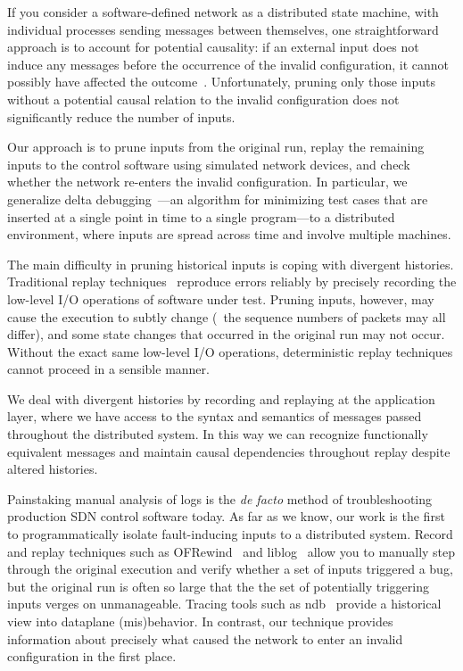 If you consider a software-defined network as a distributed state machine,
with individual processes sending messages between themselves, one straightforward approach is
to account for potential causality: if an external input does not induce any messages before
the occurrence of the invalid configuration, it
cannot possibly have affected the outcome~\cite{Lamport:1978:TCO:359545.359563}.
Unfortunately, pruning only those inputs without a potential causal relation to
the invalid configuration does not
significantly reduce the number of inputs.

Our approach is to prune inputs from the original run, replay the remaining
inputs to the control software using simulated network devices, and
check whether the network re-enters the invalid configuration.
In particular, we generalize delta
debugging~\cite{Zeller:2002:SIF:506201.506206}---an algorithm for
minimizing test cases that are inserted at a single
point in time to a single program---to a distributed environment, where inputs
are spread across time and involve multiple machines. 

The main difficulty in pruning historical inputs is
coping with divergent histories. Traditional replay
techniques~\cite{Dunlap:2002:REI:844128.844148,Geels:2006:RDD:1267359.1267386}
reproduce errors reliably by precisely recording the low-level I/O operations of
software under test. Pruning inputs, however, may cause the execution to
subtly change (\eg~the sequence numbers of packets may all differ), and some
state changes that occurred in the original
run may not occur. Without the exact same low-level I/O operations,
deterministic replay techniques cannot proceed in a sensible manner.

We deal with divergent histories by recording and replaying at the application layer,
where we have access to the syntax and semantics of messages passed
throughout the distributed system. In this way we can recognize functionally
equivalent messages and maintain causal dependencies throughout replay despite
altered histories.

Painstaking manual analysis of logs is the
{\em de facto} method of troubleshooting production SDN control software
today. As far as we know, our work
is the first to programmatically isolate fault-inducing inputs to a distributed
system. Record and replay techniques such as
OFRewind~\cite{ofrewind} and liblog~\cite{Geels:2006:RDD:1267359.1267386}
allow you to manually step through the original execution and verify whether a
set of inputs triggered a bug,
but the original run is often so large that the
the set of potentially triggering inputs verges on unmanageable.
Tracing tools such as ndb~\cite{handigol2012debugger} provide
a historical view into dataplane (mis)behavior. In contrast, our technique provides
information about precisely what caused the network to
enter an invalid configuration in the first place.

